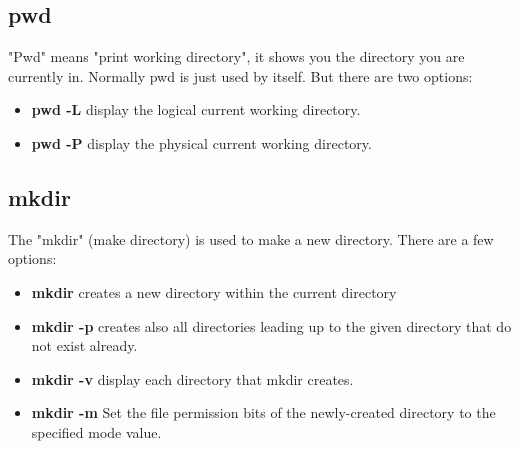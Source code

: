 \documentclass[10pt,a4paper]{scrartcl}
\begin{document}
\begin{description}
\subsection{pwd}
\begin{singlespacing}
"Pwd" means "print working directory", it shows you the directory you are currently in. Normally pwd is just used by itself. But there are two options:
\end{singlespacing}
\begin{doublespacing}
\begin{itemize}
\item{\bf{pwd -L}} \qquad display the logical current working directory.
\item{\bf{pwd -P}} \qquad display the physical current working directory.
\end{itemize}
\end{doublespacing}

\subsection{mkdir}
\begin{singlespacing}
The "mkdir" (make directory) is used to make a new directory. There are a few options:
\end{singlespacing}
\begin{doublespacing}
\begin{itemize}
\item{\bf{mkdir}} \qquad creates a new directory within the current directory
\item{\bf{mkdir -p}} \qquad creates also all directories leading up to the given directory that do not exist already.
\item{\bf{mkdir -v}} \qquad display each directory that mkdir creates.
\item{\bf{mkdir -m}} \qquad Set the file permission bits of the newly-created directory to the specified mode value.
\end{itemize}
\end{doublespacing}


\end{description}
\end{document}
